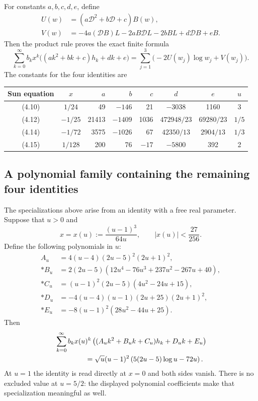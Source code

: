 \documentclass[11pt,a4paper]{article}
\theoremstyle{remark}\newtheorem{remark}[theorem]{Remark}
\numberwithin{equation}{section}
\begin{document}
For constants $a,b,c,d,e$, define
\begin{align}
 U(w)&=(a\mathcal D^2+b\mathcal D+c)B(w),\\
 V(w)&=-4a(\mathcal DB)L-2aB\mathcal DL-2bBL
       +d\mathcal DB+eB. \label{eq:beta-UV}
\end{align}
Then the product rule proves the exact finite formula
\begin{equation}
 \sum_{k=0}^{\infty}b_kx^k
 \bigl((ak^2+bk+c)h_k+dk+e\bigr)
 =\sum_{j=1}^3\bigl(-2U(w_j)\log w_j+V(w_j)\bigr).
 \label{eq:beta-polynomial-master}
\end{equation}
The constants for the four identities are
\begin{center}
\begin{tabular}{c|c|r|r|r|c|c|c}
Sun equation&$x$&$a$&$b$&$c$&$d$&$e$&$u$\\\hline
(4.10)&$1/24$&49&$-146$&21&$-3038$&1160&3\\
(4.12)&$-1/25$&21413&$-1409$&1036&$472948/23$&$69280/23$&$1/5$\\
(4.14)&$-1/72$&3575&$-1026$&67&$42350/13$&$2904/13$&$1/3$\\
(4.15)&$1/128$&200&76&$-17$&$-5800$&392&2
\end{tabular}
\end{center}

\subsection{A polynomial family containing the remaining four identities}
\label{sec:general-polynomial-family}

The specializations above arise from an identity with a free real parameter.
Suppose that $u>0$ and
\[
 x=x(u):=\frac{(u-1)^3}{64u},\qquad |x(u)|<\frac{27}{256}.
\]
Define the following polynomials in $u$:\nopagebreak
\begin{align*}
 A_u&=4(u-4)(2u-5)^2(2u+1)^2,\\*
 B_u&=2(2u-5)(12u^4-76u^3+237u^2-267u+40),\\*
 C_u&=(u-1)^2(2u-5)(4u^2-24u+15),\\*
 D_u&=-4(u-4)(u-1)(2u+25)(2u+1)^2,\\*
 E_u&=-8(u-1)^2(28u^2-44u+25).
\end{align*}
Then
\begin{equation}
\begin{split}
 &\sum_{k=0}^{\infty}b_k x(u)^k
 \left((A_uk^2+B_uk+C_u)h_k+D_uk+E_u\right)\\
 &\hspace{15mm}=\sqrt{u}(u-1)^2
 \left(5(2u-5)\log u-72u\right).
\end{split}
\label{eq:general-polynomial-family}
\end{equation}
At $u=1$ the identity is read directly at $x=0$ and both sides vanish.
There is no excluded value at $u=5/2$: the displayed polynomial coefficients
make that specialization meaningful as well.
\end{document}
